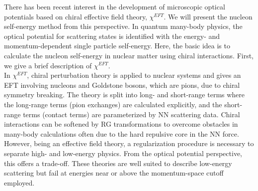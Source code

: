 \documentclass[preprintnumbers,floatfix,aps,prc,preprint,nofootinbib]{revtex4-1}
\begin{document}
There has been recent interest in the development of microscopic optical potentials based on chiral effective field theory, $\chi^{EFT}$. We will present the nucleon self-energy method from this perspective. In quantum many-body physics, the optical potential for scattering states is identified with the energy- and momentum-dependent single particle self-energy. Here, the basic idea is to calculate the nucleon self-energy in nuclear matter using chiral interactions. First, we give a brief description of $\chi^{EFT}$.
\\

In $\chi^{EFT}$, chiral perturbation theory is applied to nuclear systems and gives an EFT involving nucleons and Goldstone bosons, which are pions, due to chiral symmetry breaking. The theory is split into long- and short-range terms where the long-range terms (pion exchanges) are calculated explicitly, and the short-range terms (contact terms) are parameterized by NN scattering data. Chiral interactions can be softened by RG transformations to overcome obstacles in many-body calculations often due to the hard repulsive core in the NN force. However, being an effective field theory, a regularization procedure is necessary to separate high- and low-energy physics. From the optical potential perspective, this offers a trade-off. These theories are well suited to describe low-energy scattering but fail at energies near or above the momentum-space cutoff employed.
\\
\end{document}
